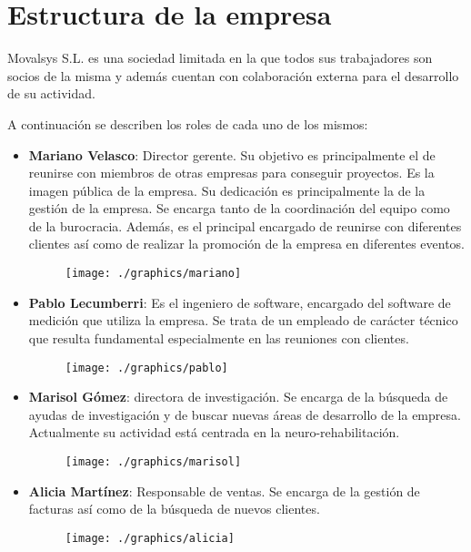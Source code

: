 	\section{Estructura de la empresa} \label{empresa}
	

		Movalsys S.L. es una sociedad limitada en la que todos sus trabajadores son socios de la misma y además cuentan con colaboración externa para el desarrollo de su actividad.
		
		A continuación se describen los roles de cada uno de los mismos:
		\begin{itemize}
			\item \textbf{Mariano Velasco}: Director gerente. Su objetivo es principalmente el de reunirse con miembros de otras empresas para conseguir proyectos. Es la imagen pública de la empresa. Su dedicación es principalmente la de la gestión de la empresa. Se encarga tanto de la coordinación del equipo como de la burocracia. Además, es el principal encargado de reunirse con diferentes clientes así como de realizar la promoción de la empresa en diferentes eventos.
			 \begin{figure}[H]
			 	\centering
			 	\texttt{[image: ./graphics/mariano]}

			 \end{figure}
			\item \textbf{Pablo Lecumberri}: Es el ingeniero de software, encargado del software de medición que utiliza la empresa. Se trata de un empleado de carácter técnico que resulta fundamental especialmente en las reuniones con clientes.
			\begin{figure}[H]
				\centering
				\texttt{[image: ./graphics/pablo]}
				
			\end{figure}
			\item \textbf{Marisol Gómez}: directora de investigación. Se encarga de la búsqueda de ayudas de investigación y de buscar nuevas áreas de desarrollo de la empresa. Actualmente su actividad está centrada en la neuro-rehabilitación.
			\begin{figure}[H]
				\centering
				\texttt{[image: ./graphics/marisol]}
				
			\end{figure}
			\item \textbf{Alicia Martínez}: Responsable de ventas. Se encarga de la gestión de facturas así como de la búsqueda de nuevos clientes. 
			\begin{figure}[H]
				\centering
				\texttt{[image: ./graphics/alicia]}
				

\end{figure}
\end{itemize}
